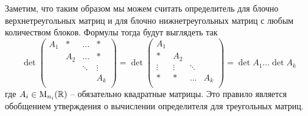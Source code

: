Заметим, что таким образом мы можем считать определитель для блочно верхнетреугольных матриц и для блочно нижнетреугольных матриц с любым количеством блоков.
Формулы тогда будут выглядеть так
\[
\det
\begin{pmatrix}
{A_1}&{*}&{\ldots}&{*}\\
{}&{A_2}&{\ldots}&{*}\\
{}&{}&{\ddots}&{\vdots}\\
{}&{}&{}&{A_k}\\
\end{pmatrix}
=
\det
\begin{pmatrix}
{A_1}&{}&{}&{}\\
{*}&{A_2}&{}&{}\\
{\vdots}&{\vdots}&{\ddots}&{}\\
{*}&{*}&{\ldots}&{A_k}\\
\end{pmatrix}
=\det A_1 \ldots \det A_k
\]
где $A_i\in\operatorname{M}_{n_i}(\mathbb R)$ -- обязательно квадратные матрицы.
Это правило является обобщением утверждения о вычислении определителя для треугольных матриц.
